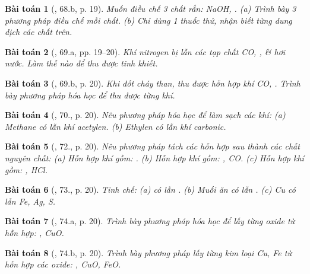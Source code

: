 \documentclass{article}
\newtheorem{baitoan}{Bài toán}
\begin{document}
\begin{baitoan}[\cite{An_400_BT_Hoa_Hoc_9}, 68.b, p. 19]
	Muốn điều chế 3 chất rắn: {\rm NaOH, }. (a) Trình bày 3 phương pháp điều chế mỗi chất. (b) Chỉ dùng 1 thuốc thử, nhận biết từng dung dịch các chất trên.
\end{baitoan}

\begin{baitoan}[\cite{An_400_BT_Hoa_Hoc_9}, 69.a, pp. 19--20]
	Khí nitrogen bị lẫn các tạp chất {\rm CO, }, \& hơi nước. Làm thế nào để thu được {\rm{}} tinh khiết.
\end{baitoan}

\begin{baitoan}[\cite{An_400_BT_Hoa_Hoc_9}, 69.b, p. 20]
	Khi đốt cháy than, thu được hỗn hợp khí {\rm CO, }. Trình bày phương pháp hóa học để thu được từng khí.
\end{baitoan}

\begin{baitoan}[\cite{An_400_BT_Hoa_Hoc_9}, 70., p. 20]
	Nêu phương pháp hóa học để làm sạch các khí: (a) Methane có lẫn khí acetylen. (b) Ethylen có lẫn khí carbonic.
\end{baitoan}

\begin{baitoan}[\cite{An_400_BT_Hoa_Hoc_9}, 72., p. 20]
	Nêu phương pháp tách các hỗn hợp sau thành các chất nguyên chất: (a) Hỗn hợp khí gồm: {\rm{}}. (b) Hỗn hợp khí gồm: {\rm{}, CO}. (c) Hỗn hợp khí gồm: {\rm{}, HCl}.
\end{baitoan}

\begin{baitoan}[\cite{An_400_BT_Hoa_Hoc_9}, 73., p. 20]
	Tinh chế: (a) {\rm{}} có lẫn {\rm{}}. (b) Muối ăn có lẫn {\rm{}}. (c) {\rm Cu} có lẫn {\rm Fe, Ag, S}.
\end{baitoan}

\begin{baitoan}[\cite{An_400_BT_Hoa_Hoc_9}, 74.a, p. 20]
	Trình bày phương pháp hóa học để lấy từng oxide từ hỗn hợp: {\rm{}, CuO}.
\end{baitoan}

\begin{baitoan}[\cite{An_400_BT_Hoa_Hoc_9}, 74.b, p. 20]
	Trình bày phương pháp lấy từng kim loại {\rm Cu, Fe} từ hỗn hợp các oxide: {\rm{}, CuO, FeO}.
\end{baitoan}
\end{document}
